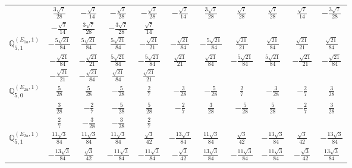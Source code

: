 \documentclass[fleqn,10pt,landscape]{article}
\begin{document}
\begin{itemize}
{\begin{center}
\begin{longtable}{ccccccccccc}
& $ \frac{3 \sqrt{7}}{28} $ & $ - \frac{\sqrt{7}}{14} $ & $ - \frac{\sqrt{7}}{28} $ & $ - \frac{\sqrt{7}}{28} $ & $ - \frac{\sqrt{7}}{14} $ & $ \frac{3 \sqrt{7}}{28} $ & $ \frac{\sqrt{7}}{28} $ & $ \frac{\sqrt{7}}{28} $ & $ \frac{\sqrt{7}}{14} $ & $ - \frac{3 \sqrt{7}}{28} $ \\
& $ - \frac{\sqrt{7}}{14} $ & $ \frac{3 \sqrt{7}}{28} $ & $ - \frac{3 \sqrt{7}}{28} $ & $ \frac{\sqrt{7}}{14} $ & $  $ & $  $ & $  $ & $  $ & $  $ & $  $ \\ \hline
$\mathbb{Q}_{5,1}^{(E_{1u},1)}$ & $ - \frac{5 \sqrt{21}}{84} $ & $ \frac{5 \sqrt{21}}{84} $ & $ \frac{5 \sqrt{21}}{84} $ & $ - \frac{\sqrt{21}}{21} $ & $ - \frac{\sqrt{21}}{84} $ & $ - \frac{5 \sqrt{21}}{84} $ & $ \frac{\sqrt{21}}{21} $ & $ \frac{\sqrt{21}}{84} $ & $ \frac{\sqrt{21}}{21} $ & $ \frac{\sqrt{21}}{84} $ \\
& $ - \frac{\sqrt{21}}{84} $ & $ - \frac{\sqrt{21}}{21} $ & $ \frac{5 \sqrt{21}}{84} $ & $ - \frac{5 \sqrt{21}}{84} $ & $ \frac{\sqrt{21}}{21} $ & $ \frac{\sqrt{21}}{84} $ & $ - \frac{5 \sqrt{21}}{84} $ & $ \frac{5 \sqrt{21}}{84} $ & $ - \frac{\sqrt{21}}{21} $ & $ - \frac{\sqrt{21}}{84} $ \\
& $ - \frac{\sqrt{21}}{21} $ & $ - \frac{\sqrt{21}}{84} $ & $ \frac{\sqrt{21}}{84} $ & $ \frac{\sqrt{21}}{21} $ & $  $ & $  $ & $  $ & $  $ & $  $ & $  $ \\ \hline
$\mathbb{Q}_{5,0}^{(E_{2u},1)}$ & $ \frac{5}{28} $ & $ \frac{5}{28} $ & $ - \frac{5}{28} $ & $ \frac{2}{7} $ & $ - \frac{3}{28} $ & $ - \frac{5}{28} $ & $ \frac{2}{7} $ & $ - \frac{3}{28} $ & $ - \frac{2}{7} $ & $ \frac{3}{28} $ \\
& $ \frac{3}{28} $ & $ - \frac{2}{7} $ & $ - \frac{5}{28} $ & $ \frac{5}{28} $ & $ - \frac{2}{7} $ & $ \frac{3}{28} $ & $ - \frac{5}{28} $ & $ \frac{5}{28} $ & $ - \frac{2}{7} $ & $ \frac{3}{28} $ \\
& $ \frac{2}{7} $ & $ - \frac{3}{28} $ & $ - \frac{3}{28} $ & $ \frac{2}{7} $ & $  $ & $  $ & $  $ & $  $ & $  $ & $  $ \\ \hline
$\mathbb{Q}_{5,1}^{(E_{2u},1)}$ & $ \frac{11 \sqrt{3}}{84} $ & $ \frac{11 \sqrt{3}}{84} $ & $ \frac{11 \sqrt{3}}{84} $ & $ \frac{\sqrt{3}}{42} $ & $ - \frac{13 \sqrt{3}}{84} $ & $ \frac{11 \sqrt{3}}{84} $ & $ \frac{\sqrt{3}}{42} $ & $ - \frac{13 \sqrt{3}}{84} $ & $ \frac{\sqrt{3}}{42} $ & $ - \frac{13 \sqrt{3}}{84} $ \\
& $ - \frac{13 \sqrt{3}}{84} $ & $ \frac{\sqrt{3}}{42} $ & $ - \frac{11 \sqrt{3}}{84} $ & $ - \frac{11 \sqrt{3}}{84} $ & $ - \frac{\sqrt{3}}{42} $ & $ \frac{13 \sqrt{3}}{84} $ & $ - \frac{11 \sqrt{3}}{84} $ & $ - \frac{11 \sqrt{3}}{84} $ & $ - \frac{\sqrt{3}}{42} $ & $ \frac{13 \sqrt{3}}{84} $ \\

\end{longtable}
\end{center}}
\end{itemize}
\end{document}
